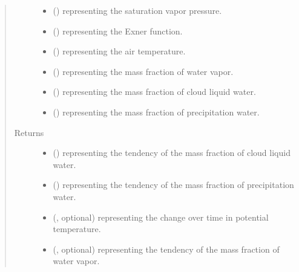 \documentclass[letterpaper,10pt,english]{sphinxmanual}
\begin{document}
\begin{fulllineitems}
\begin{fulllineitems}
\begin{quote}
\begin{description}
\begin{itemize}
\item {} 
 () \textendash{}  representing the saturation vapor pressure.

\item {} 
 () \textendash{}  representing the Exner function.

\item {} 
 () \textendash{}  representing the air temperature.

\item {} 
 () \textendash{}  representing the mass fraction of water vapor.

\item {} 
 () \textendash{}  representing the mass fraction of cloud liquid water.

\item {} 
 () \textendash{}  representing the mass fraction of precipitation water.

\end{itemize}

\item[{Returns}] \leavevmode
\begin{itemize}
\item {} 
 () \textendash{}  representing the tendency of the mass fraction of cloud liquid water.

\item {} 
 () \textendash{}  representing the tendency of the mass fraction of precipitation water.

\item {} 
 (, optional) \textendash{}  representing the change over time in potential temperature.

\item {} 
 (, optional) \textendash{}  representing the tendency of the mass fraction of water vapor.


\end{itemize}
\end{description}
\end{quote}
\end{fulllineitems}
\end{fulllineitems}
\end{document}

